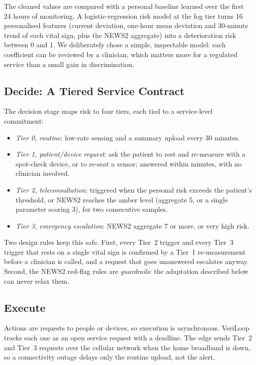 \documentclass[journal]{IEEEtran}
\begin{document}
The cleaned values are compared with a personal baseline learned over the first 24 hours of monitoring. A
logistic-regression risk model at the fog tier turns 16 personalised features (current deviation, one-hour mean
deviation and 30-minute trend of each vital sign, plus the NEWS2 aggregate) into a deterioration risk between 0 and 1.
We deliberately chose a simple, inspectable model: each coefficient can be reviewed by a clinician, which matters more
for a regulated service than a small gain in discrimination.

\subsection*{Decide: A Tiered Service Contract}

The decision stage maps risk to four tiers, each tied to a service-level commitment:
\begin{itemize}
\item \emph{Tier 0, routine}: low-rate sensing and a summary upload every 30 minutes.
\item \emph{Tier 1, patient/device request}: ask the patient to rest and re-measure with a spot-check device, or to
re-seat a sensor; answered within minutes, with no clinician involved.
\item \emph{Tier 2, teleconsultation}: triggered when the personal risk exceeds the patient's threshold, or NEWS2
reaches the amber level (aggregate 5, or a single parameter scoring 3), for two consecutive samples.
\item \emph{Tier 3, emergency escalation}: NEWS2 aggregate 7 or more, or very high risk.
\end{itemize}
Two design rules keep this safe. First, every Tier~2 trigger and every Tier~3 trigger that rests on a single vital
sign is confirmed by a Tier~1 re-measurement before a clinician is called, and a request that goes unanswered escalates
anyway. Second, the NEWS2 red-flag rules are \emph{guardrails}: the adaptation described below can never relax them.

\subsection*{Execute}

Actions are requests to people or devices, so execution is asynchronous. VeriLoop tracks each one as an open service
request with a deadline. The edge sends Tier~2 and Tier~3 requests over the cellular network when the home broadband is
down, so a connectivity outage delays only the routine upload, not the alert.
\end{document}
